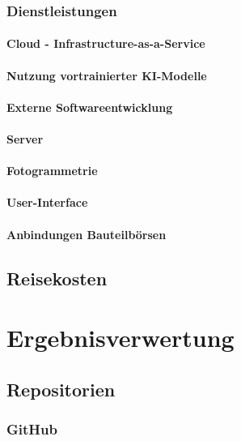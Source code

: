 \documentclass[type=zwischenbericht]{zukunftbau}
\begin{document}
\subsubsection{Dienstleistungen}
\begin{SemioNest}
\paragraph{Cloud - Infrastructure-as-a-Service}
\paragraph{Nutzung vortrainierter KI-Modelle}
\paragraph{Externe Softwareentwicklung}
\begin{SemioNest}
\paragraph{Server}
\paragraph{Fotogrammetrie}
\paragraph{User-Interface}
\paragraph{Anbindungen Bauteilbörsen}
\end{SemioNest}
\end{SemioNest}

\subsection{Reisekosten}

\section{Ergebnisverwertung}

\subsection{Repositorien}

\subsubsection{GitHub}
\end{document}
